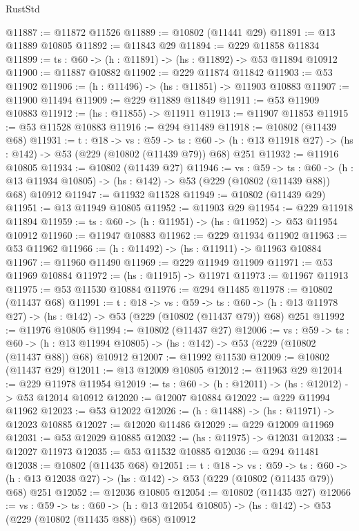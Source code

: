 \begin{lexlean}{RustStd}
\begin{coremodule}
@11887 := @11872 @11526
@11889 := @10802 (@11441 @29)
@11891 := @13 @11889 @10805
@11892 := @11843 @29
@11894 := @229 @11858 @11834
@11899 := {ts : @60} -> (h : @11891) -> (hs : @11892) -> @53 @11894 @10912
@11900 := @11887 @10882
@11902 := @229 @11874 @11842
@11903 := @53 @11902
@11906 := (h : @11496) -> (hs : @11851) -> @11903 @10883
@11907 := @11900 @11494
@11909 := @229 @11889 @11849
@11911 := @53 @11909 @10883
@11912 := (hs : @11855) -> @11911
@11913 := @11907 @11853
@11915 := @53 @11528 @10883
@11916 := @294 @11489
@11918 := @10802 (@11439 @68)
@11931 := {t : @18} ->
  {vs : @59} ->
  {ts : @60} -> (h : @13 @11918 @27) -> (hs : @142) -> @53 (@229 (@10802 (@11439 @79)) @68) @251
@11932 := @11916 @10805
@11934 := @10802 (@11439 @27)
@11946 := {vs : @59} ->
  {ts : @60} ->
  (h : @13 @11934 @10805) -> (hs : @142) -> @53 (@229 (@10802 (@11439 @88)) @68) @10912
@11947 := @11932 @11528
@11949 := @10802 (@11439 @29)
@11951 := @13 @11949 @10805
@11952 := @11903 @29
@11954 := @229 @11918 @11894
@11959 := {ts : @60} -> (h : @11951) -> (hs : @11952) -> @53 @11954 @10912
@11960 := @11947 @10883
@11962 := @229 @11934 @11902
@11963 := @53 @11962
@11966 := (h : @11492) -> (hs : @11911) -> @11963 @10884
@11967 := @11960 @11490
@11969 := @229 @11949 @11909
@11971 := @53 @11969 @10884
@11972 := (hs : @11915) -> @11971
@11973 := @11967 @11913
@11975 := @53 @11530 @10884
@11976 := @294 @11485
@11978 := @10802 (@11437 @68)
@11991 := {t : @18} ->
  {vs : @59} ->
  {ts : @60} -> (h : @13 @11978 @27) -> (hs : @142) -> @53 (@229 (@10802 (@11437 @79)) @68) @251
@11992 := @11976 @10805
@11994 := @10802 (@11437 @27)
@12006 := {vs : @59} ->
  {ts : @60} ->
  (h : @13 @11994 @10805) -> (hs : @142) -> @53 (@229 (@10802 (@11437 @88)) @68) @10912
@12007 := @11992 @11530
@12009 := @10802 (@11437 @29)
@12011 := @13 @12009 @10805
@12012 := @11963 @29
@12014 := @229 @11978 @11954
@12019 := {ts : @60} -> (h : @12011) -> (hs : @12012) -> @53 @12014 @10912
@12020 := @12007 @10884
@12022 := @229 @11994 @11962
@12023 := @53 @12022
@12026 := (h : @11488) -> (hs : @11971) -> @12023 @10885
@12027 := @12020 @11486
@12029 := @229 @12009 @11969
@12031 := @53 @12029 @10885
@12032 := (hs : @11975) -> @12031
@12033 := @12027 @11973
@12035 := @53 @11532 @10885
@12036 := @294 @11481
@12038 := @10802 (@11435 @68)
@12051 := {t : @18} ->
  {vs : @59} ->
  {ts : @60} -> (h : @13 @12038 @27) -> (hs : @142) -> @53 (@229 (@10802 (@11435 @79)) @68) @251
@12052 := @12036 @10805
@12054 := @10802 (@11435 @27)
@12066 := {vs : @59} ->
  {ts : @60} ->
  (h : @13 @12054 @10805) -> (hs : @142) -> @53 (@229 (@10802 (@11435 @88)) @68) @10912

\end{coremodule}
\end{lexlean}
